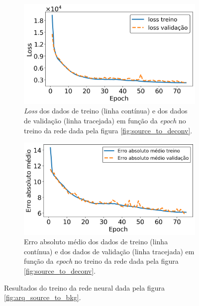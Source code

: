 \documentclass[a4paper,12pt,oneside]{book}
\begin{document}
\begin{figure}[H]
\centering
    \begin{subfigure}[t]{0.49\textwidth}
        \centering
        \includegraphics[scale=0.42]{figs/source_wo_bkg_to_deconv_loss.png}
        \caption{\textit{Loss} dos dados de treino (linha contínua) e dos dados de validação (linha tracejada) em função da \textit{epoch} no treino da rede dada pela figura \ref{fig:source_to_deconv}.}
        \label{subfig:source_wo_bkg_to_deconv_loss}
    \end{subfigure}%
    \hfill
    \begin{subfigure}[t]{0.465\textwidth}
        \centering
        \includegraphics[scale=0.42]{figs/source_wo_bkg_to_deconv_metric.png}
        \caption{Erro absoluto médio dos dados de treino (linha contínua) e dos dados de validação (linha tracejada) em função da \textit{epoch} no treino da rede dada pela figura \ref{fig:source_to_deconv}.}
        \label{subfig:source_wo_bkg_to_deconv_metric}
    \end{subfigure}
\caption{Resultados do treino da rede neural dada pela figura \ref{fig:arq_source_to_bkg}.}
\label{fig:source_wo_bkg_to_deconv_results}
\end{figure}
\end{document}
